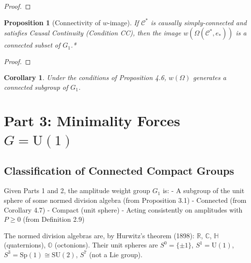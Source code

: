 \documentclass[11pt]{article}
\newtheorem{proposition}[theorem]{Proposition}
\newtheorem{corollary}[theorem]{Corollary}
\theoremstyle{definition}
\theoremstyle{remark}
\begin{document}
\begin{proof}

\end{proof}

\begin{proposition}[Connectivity of $w$-image]
\label{proposition:4-6}
If $\mathcal{C}^{*}$ is causally simply-connected and satisfies Causal Continuity (Condition CC), then the image $w(\Omega(\mathcal{C}^{*}, e_{*}))$ is a connected subset of $G_1$.*
\end{proposition}

\begin{proof}

\end{proof}

\begin{corollary}
\label{corollary:4-7}
Under the conditions of Proposition 4.6, $w(\Omega)$ generates a connected subgroup of $G_1$.
\end{corollary}

\medskip

\section{\texorpdfstring{Part 3: Minimality Forces
\(G = \mathrm{U}(1)\)}{Part 3: Minimality Forces G = \textbackslash mathrm\{U\}(1)}}\label{part-3-minimality-forces-g-mathrmu1}

\subsection{Classification of Connected Compact
Groups}\label{classification-of-connected-compact-groups}

Given Parts 1 and 2, the amplitude weight group \(G_1\) is: - A subgroup
of the unit sphere of some normed division algebra (from Proposition
3.1) - Connected (from Corollary 4.7) - Compact (unit sphere) - Acting
consistently on amplitudes with \(P \geq 0\) (from Definition 2.9)

The normed division algebras are, by Hurwitz's theorem (1898):
\(\mathbb{R}\), \(\mathbb{C}\), \(\mathbb{H}\) (quaternions),
\(\mathbb{O}\) (octonions). Their unit spheres are \(S^0 = \{±1\}\),
\(S^1 = \mathrm{U}(1)\), \(S^3 = \mathrm{Sp}(1) \cong \mathrm{SU}(2)\),
\(S^7\) (not a Lie group).
\end{document}
